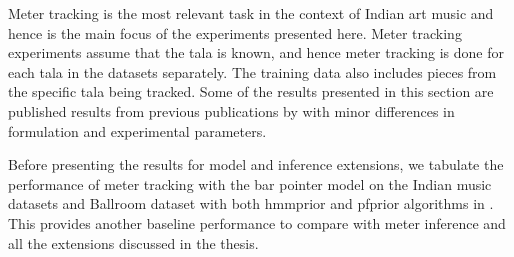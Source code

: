% 
Meter tracking is the most relevant task in the context of Indian art music and hence is the main focus of the experiments presented here. Meter tracking experiments assume that the \gls{tala} is known, and hence meter tracking is done for each \gls{tala} in the datasets separately. The training data also includes pieces from the specific \gls{tala} being tracked. Some of the results presented in this section are published results from previous publications by  with minor differences in formulation and experimental parameters. 

Before presenting the results for model and inference extensions, we tabulate the performance of meter tracking with the bar pointer model on the Indian music datasets and Ballroom dataset with both \acrshort{hmmprior} and \acrshort{pfprior} algorithms in . This provides another baseline performance to compare with meter inference and all the extensions discussed in the thesis. 
